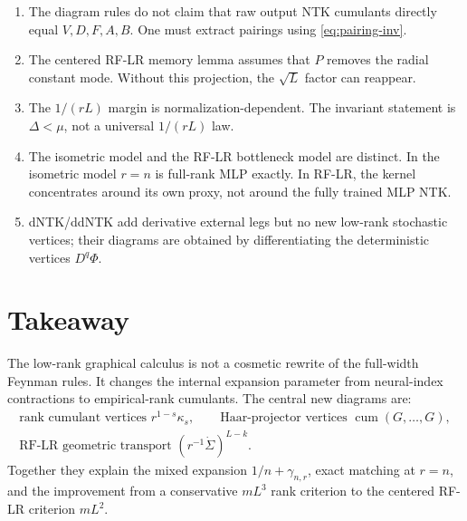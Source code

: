 \documentclass[11pt]{article}
\newcommand{\cum}{\operatorname{cum}}
\begin{document}
\begin{enumerate}
\item The diagram rules do not claim that raw output NTK cumulants directly equal $V,D,F,A,B$.  One must extract pairings using \eqref{eq:pairing-inv}.
\item The centered RF-LR memory lemma assumes that $P$ removes the radial constant mode.  Without this projection, the $\sqrt L$ factor can reappear.
\item The $1/(rL)$ margin is normalization-dependent.  The invariant statement is $\Delta<\mu$, not a universal $1/(rL)$ law.
\item The isometric model and the RF-LR bottleneck model are distinct.  In the isometric model $r=n$ is full-rank MLP exactly.  In RF-LR, the kernel concentrates around its own proxy, not around the fully trained MLP NTK.
\item dNTK/ddNTK add derivative external legs but no new low-rank stochastic vertices; their diagrams are obtained by differentiating the deterministic vertices $D^q\Phi$.
\end{enumerate}

\section{Takeaway}

The low-rank graphical calculus is not a cosmetic rewrite of the full-width Feynman rules.  It changes the internal expansion parameter from neural-index contractions to empirical-rank cumulants.  The central new diagrams are:
\[
\begin{gathered}
\boxed{\text{rank cumulant vertices } r^{1-s}\kappa_s,}\qquad
\boxed{\text{Haar-projector vertices } \cum(G,\ldots,G),}\\[1mm]
\boxed{\text{RF-LR geometric transport } (r^{-1}\dot\Sigma)^{L-k}.}
\end{gathered}
\]
Together they explain the mixed expansion $1/n+\gamma_{n,r}$, exact matching at $r=n$, and the improvement from a conservative $mL^3$ rank criterion to the centered RF-LR criterion $mL^2$.
\end{document}
